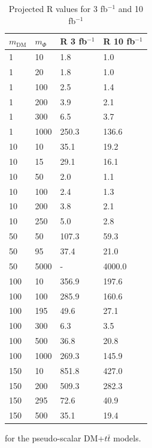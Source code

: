 \begin{table}[h]
\centering
\begin{tabular}{llll}
\hline                      
 $m_\textrm{DM}$ & $m_\Phi$  & R 3 fb$^{-1}$ & R 10 fb$^{-1}$ \\ \hline
1       & 10      & 1.8     & 1.0 \\ \hline
1       & 20      & 1.8     & 1.0 \\ \hline
1       & 100     & 2.5     & 1.4 \\ \hline
1       & 200     & 3.9     & 2.1 \\ \hline
1       & 300     & 6.5     & 3.7 \\ \hline
1       & 1000    & 250.3   & 136.6 \\ \hline
10      & 10      & 35.1    & 19.2 \\ \hline
10      & 15      & 29.1    & 16.1 \\ \hline
10      & 50      & 2.0     & 1.1 \\ \hline
10      & 100     & 2.4     & 1.3 \\ \hline
10      & 200     & 3.8     & 2.1 \\ \hline
10      & 250     & 5.0     & 2.8 \\ \hline
50      & 50      & 107.3   & 59.3 \\ \hline
50      & 95      & 37.4    & 21.0 \\ \hline
50      & 5000    & -       & 4000.0 \\ \hline
100     & 10      & 356.9   & 197.6 \\ \hline
100     & 100     & 285.9   & 160.6 \\ \hline
100     & 195     & 49.6    & 27.1 \\ \hline
100     & 300     & 6.3     & 3.5 \\ \hline
100     & 500     & 36.8    & 20.8 \\ \hline
100     & 1000    & 269.3   & 145.9 \\ \hline
150     & 10      & 851.8   & 427.0 \\ \hline
150     & 200     & 509.3   & 282.3 \\ \hline
150     & 295     & 72.6    & 40.9 \\ \hline
150     & 500     & 35.1    & 19.4 \\ \hline
\end{tabular}
\caption{Projected R values for 3 fb$^{-1}$ and 10 fb$^{-1}$} for the pseudo-scalar DM+$t\bar{t}$ models.
\label{tab:dmtt_P_R_values}
\end{table}


